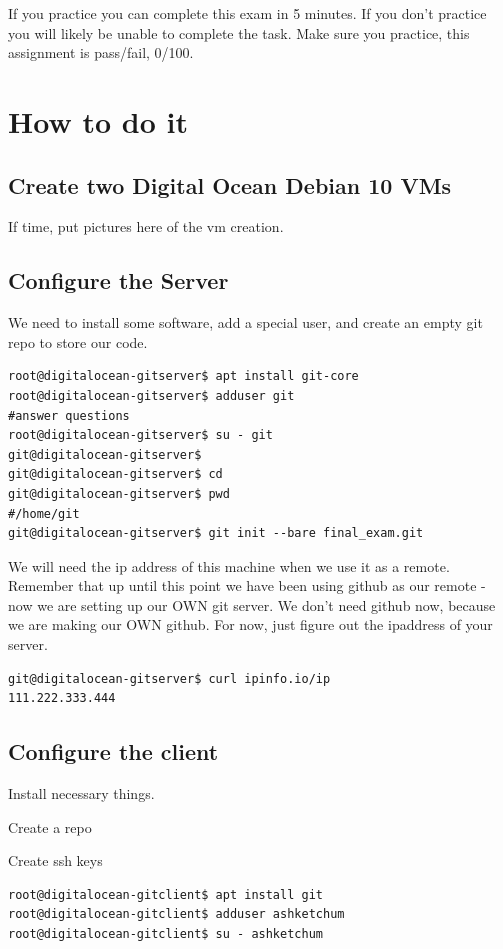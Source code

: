 \documentclass[10pt]{article}
\begin{document}
If you practice you can complete this exam in 5 minutes. If you don't practice
you will likely be unable to complete the task. Make sure you practice, this
assignment is pass/fail, 0/100.

\section{How to do it}
\subsection{Create two Digital Ocean Debian 10 VMs}
If time, put pictures here of the vm creation.

\subsection{Configure the Server}

We need to install some software, add a special user, and create an empty git
repo to store our code.
\begin{lstlisting}
root@digitalocean-gitserver$ apt install git-core
root@digitalocean-gitserver$ adduser git
#answer questions
root@digitalocean-gitserver$ su - git
git@digitalocean-gitserver$
git@digitalocean-gitserver$ cd
git@digitalocean-gitserver$ pwd
#/home/git
git@digitalocean-gitserver$ git init --bare final_exam.git
\end{lstlisting}

We will need the ip address of this machine when we use it as a remote. Remember
that up until this point we have been using github as our remote - now we are
setting up our OWN git server. We don't need github now, because we are making
our OWN github. For now, just figure out the ipaddress of your server.

\begin{lstlisting}
git@digitalocean-gitserver$ curl ipinfo.io/ip
111.222.333.444
\end{lstlisting}


\subsection{Configure the client}
Install necessary things. 

Create a repo

Create ssh keys

\begin{lstlisting}
root@digitalocean-gitclient$ apt install git
root@digitalocean-gitclient$ adduser ashketchum
root@digitalocean-gitclient$ su - ashketchum
\end{lstlisting}
\end{document}
